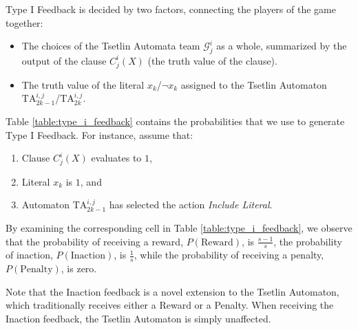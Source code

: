 \documentclass[11pt,a4paper]{article}
\newcommand{\True}{\mbox{1}}
\begin{document}
Type I Feedback is decided by two factors, connecting the players of the game together:
\begin{itemize}
    \item The choices of the Tsetlin Automata team $\mathcal{G}^i_j$ as a whole, summarized by the output of the clause $C_j^i(X)$ (the truth value of the clause).
    \item The truth value of the literal $x_k$/$\lnot x_k$ assigned to the Tsetlin Automaton $\mathrm{TA}^{i,j}_{2k-1}$/$\mathrm{TA}^{i,j}_{2k}$.
\end{itemize}
Table \ref{table:type_i_feedback} contains the probabilities that we use to generate  Type I Feedback. For instance, assume that:
\begin{enumerate}
    \item Clause $C^i_j(X)$ evaluates to $\True$,
    \item Literal $x_k$ is $\True$, and
    \item Automaton $\mathrm{TA}^{i,j}_{2k-1}$ has selected the action \emph{Include Literal}.
\end{enumerate}
By examining the corresponding cell in Table \ref{table:type_i_feedback}, we observe that the probability of receiving a reward, $P(\mathrm{Reward})$, is $\frac{s-1}{s}$, the probability of inaction, $P(\mathrm{Inaction})$, is $\frac{1}{s}$, while the probability of receiving a penalty, $P(\mathrm{Penalty})$, is zero.

Note that the Inaction feedback is a novel extension to the Tsetlin Automaton, which traditionally receives either a Reward or a Penalty. When receiving the Inaction feedback, the Tsetlin Automaton is simply unaffected.
\end{document}
